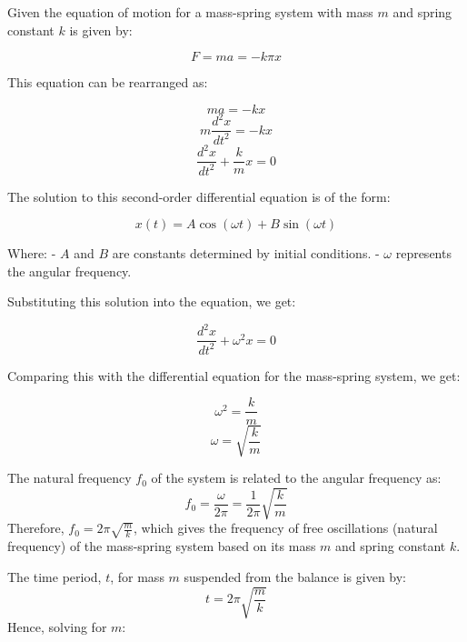 \documentclass[journal,12pt,twocolumn]{IEEEtran}
\theoremstyle{remark}
\begin{document}
	Given the equation of motion for a mass-spring system with mass $m$ and spring constant $k$ is given by:

\begin{equation} 
	F = ma = -k\pi x
\end{equation}

This equation can be rearranged as:

\begin{equation}
	ma = -kx 
\end{equation}
\begin{equation}
	m\frac{d^2x}{dt^2} = -kx 
\end{equation}
\begin{equation}
	\frac{d^2x}{dt^2} + \frac{k}{m}x = 0 
\end{equation}

The solution to this second-order differential equation is of the form:

\begin{equation}
x(t) = A\cos(\omega t) + B\sin(\omega t) 
\end{equation}

Where:
- $A$ and $B$ are constants determined by initial conditions.
- $\omega$ represents the angular frequency.

Substituting this solution into the equation, we get:

\begin{equation}
\frac{d^2x}{dt^2} + \omega^2x = 0 
\end{equation}



Comparing this with the differential equation for the mass-spring system, we get:

\begin{equation}
\omega^2 = \frac{k}{m} 
\end{equation}
\begin{equation}
 \omega = \sqrt{\frac{k}{m}} 
\end{equation}

The natural frequency $f_0$ of the system is related to the angular frequency as:
\begin{equation}
 f_0 = \frac{\omega}{2\pi} = \frac{1}{2\pi}\sqrt{\frac{k}{m}} 
\end{equation}
Therefore, $f_0 = 2\pi \sqrt{\frac{m}{k}}$, which gives the frequency of free oscillations (natural frequency) of the mass-spring system based on its mass $m$ and spring constant $k$.


The time period, \( t \), for mass \( m \) suspended from the balance is given by:
\begin{equation}
t = 2\pi\sqrt{\frac{m}{k}}
\end{equation}
Hence, solving for \( m \):
\end{document}
